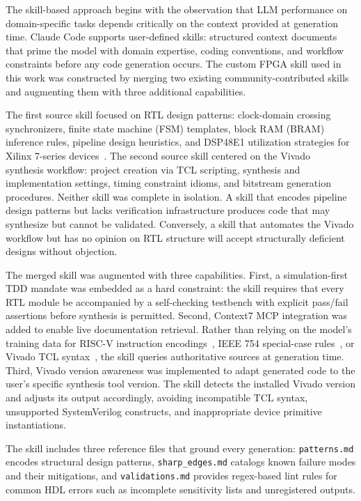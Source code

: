 \documentclass[conference]{IEEEtran}
\begin{document}
The skill-based approach begins with the observation that LLM performance on domain-specific tasks depends critically on the context provided at generation time. Claude Code supports user-defined skills: structured context documents that prime the model with domain expertise, coding conventions, and workflow constraints before any code generation occurs. The custom FPGA skill used in this work was constructed by merging two existing community-contributed skills and augmenting them with three additional capabilities.

The first source skill focused on RTL design patterns: clock-domain crossing synchronizers, finite state machine (FSM) templates, block RAM (BRAM) inference rules, pipeline design heuristics, and DSP48E1 utilization strategies for Xilinx 7-series devices~\cite{xilinx2020ds180}. The second source skill centered on the Vivado~\cite{xilinx2020ug901} synthesis workflow: project creation via TCL scripting, synthesis and implementation settings, timing constraint idioms, and bitstream generation procedures. Neither skill was complete in isolation. A skill that encodes pipeline design patterns but lacks verification infrastructure produces code that may synthesize but cannot be validated. Conversely, a skill that automates the Vivado workflow but has no opinion on RTL structure will accept structurally deficient designs without objection.

The merged skill was augmented with three capabilities. First, a simulation-first TDD mandate was embedded as a hard constraint: the skill requires that every RTL module be accompanied by a self-checking testbench with explicit pass/fail assertions before synthesis is permitted. Second, Context7 MCP integration was added to enable live documentation retrieval. Rather than relying on the model's training data for RISC-V instruction encodings~\cite{waterman2019riscv}, IEEE 754 special-case rules~\cite{ieee754_2019}, or Vivado TCL syntax~\cite{xilinx2020ug901}, the skill queries authoritative sources at generation time. Third, Vivado version awareness was implemented to adapt generated code to the user's specific synthesis tool version. The skill detects the installed Vivado version and adjusts its output accordingly, avoiding incompatible TCL syntax, unsupported SystemVerilog constructs, and inappropriate device primitive instantiations.

The skill includes three reference files that ground every generation: \texttt{patterns.md} encodes structural design patterns, \texttt{sharp\_edges.md} catalogs known failure modes and their mitigations, and \texttt{validations.md} provides regex-based lint rules for common HDL errors such as incomplete sensitivity lists and unregistered outputs.
\end{document}
